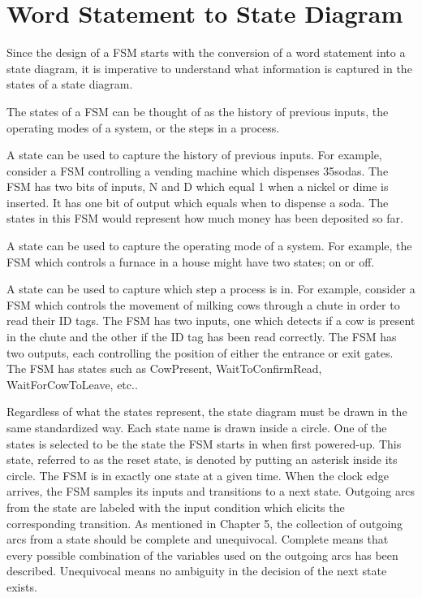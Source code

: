\section{Word Statement to State Diagram}

Since the design of a FSM starts with the conversion of a word statement into
a state diagram, it is imperative to understand what information is captured
in the states of a state diagram.

The states of a FSM can be thought of as the history of previous
inputs, the operating modes of a system, or the steps in a process.

A state can be used to capture the history of previous inputs.  For example,
consider a FSM controlling a vending machine which dispenses
35\textcent sodas.  The
FSM has two bits of inputs, N and D which equal 1 when a nickel or dime is
inserted.  It has one bit of output which equals when to dispense a soda.  The
states in this FSM would represent how much money has been deposited so far.

A state can be used to capture the operating mode of a system.  For example,
the FSM which controls a furnace in a house might have two states;
on or off.

A state can be used to capture which step a process is in.  For example,
consider a FSM which controls the movement of milking cows through a chute
in order to read their ID tags.  The FSM has two inputs, one which detects
if a cow is present in the chute and the other if the ID tag has been
read correctly. The FSM has two outputs, each controlling the position of either
the entrance or exit gates.  The FSM has states such as CowPresent,
WaitToConfirmRead, WaitForCowToLeave, etc..

Regardless of what the states represent, the state diagram must be drawn in the
same standardized way.  Each state name is drawn inside a circle.
One of the states is selected to be the state the FSM starts in when
first powered-up.  This state, referred to as the reset state, is
denoted by putting an asterisk inside its
circle.  The FSM is in exactly one state at a given time.  When the clock edge
arrives, the FSM samples its inputs and transitions to a next state.  Outgoing
arcs from the state are labeled with the input condition which elicits the
corresponding transition.  As mentioned in Chapter 5, the collection of
outgoing arcs from a state should be complete and unequivocal.  Complete means
that every possible combination of the variables used on the outgoing arcs has
been described.  Unequivocal means  no ambiguity in the decision of
the next state exists.

